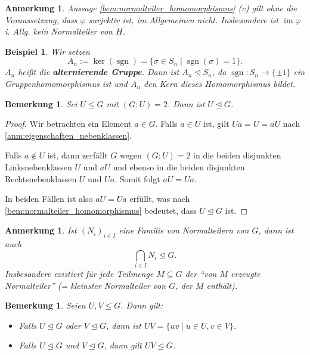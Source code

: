 \documentclass[a4paper, twoside, 11pt, ngerman]{report}
\DeclareMathOperator{\image}{im}
\DeclareMathOperator{\sgn}{sgn}
\theoremstyle{definistyle}
\newtheorem{bem}[satz]{Bemerkung}
\newtheorem{anm}[satz]{Anmerkung}
\newtheorem{bsp}[satz]{Beispiel}
\theoremstyle{remark}
\newcommand{\defn}[1]{\textit{\bfseries #1}}
\begin{document}
\begin{anm}\label{anm:normalteiler_homomorphismus_surjektiv}
Aussage \ref{bem:normalteiler_homomorphismus} (c) gilt ohne die Voraussetzung, dass $\varphi$ surjektiv ist, im Allgemeinen nicht. Insbesondere ist  $\image\varphi$ i. Allg. kein Normalteiler von $H$.
\end{anm}

\begin{bsp}\label{bsp:alternierende_gruppe}
Wir setzen \[A_n := \ker(\sgn) = \{ \sigma \in S_n \mid \sgn(\sigma) = 1 \}.\] 
$A_n$ heißt die \defn{alternierende Gruppe}. Dann ist $A_n \trianglelefteq S_n$, da $\sgn \colon S_n \to \{\pm 1\}$ ein Gruppenhomomorphismus ist und $A_n$ den Kern dieses Homomorphismus bildet.
\end{bsp}

\begin{bem}\label{bem:ordnung_index_2_normalteiler}
Sei $U \leq G$ mit $(G : U) = 2$. Dann ist $U \trianglelefteq G$.
\end{bem}

\begin{proof}
Wir betrachten ein Element $a \in G$. Falls $a \in U$ ist, gilt $Ua = U = aU$ nach \ref{anm:eigenschaften_nebenklassen}. 

Falls $a \notin U$ ist, dann zerfällt $G$ wegen $(G:U)=2$ in die beiden disjunkten Linksnebenklassen $U$ und $aU$ und ebenso in die beiden disjunkten Rechtsnebenklassen $U$ und $Ua$. Somit folgt $aU = Ua$. 

In beiden Fällen ist also $aU = Ua$ erfüllt, was nach \ref{bem:normalteiler_homomorphismus} bedeutet, dass $U \trianglelefteq G$ ist.
\end{proof}


\begin{anm}\label{anm:kleinster_normalteiler}
Ist $(N_i)_{i \in I}$ eine Familie von Normalteilern von $G$, dann ist auch
\[
\bigcap_{i \in I} N_i \trianglelefteq G.
\]
Insbesondere existiert für jede Teilmenge $M \subseteq G$ der "`von $M$ erzeugte Normalteiler"' 
(= kleinster Normalteiler von $G$, der $M$ enthält).
\end{anm}

\begin{bem}\label{bem:produkt_normalteiler}
Seien $U, V \leq G$. Dann gilt:
\begin{itemize}
    \item[(a)] Falls $U \trianglelefteq G$ oder $V \trianglelefteq G$, dann ist $UV = \{uv \mid u \in U, v \in V\}$.
    \item[(b)] Falls $U \trianglelefteq G$ und $V \trianglelefteq G$, dann gilt $UV \trianglelefteq G$.
\end{itemize}
\end{bem}
\end{document}
